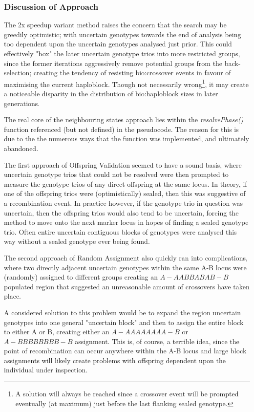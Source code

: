 \subsubsection{Discussion of Approach}

The 2x speedup variant method raises the concern that the search may be greedily optimistic; with uncertain genotypes towards the end of analysis being too dependent upon the uncertain genotypes analysed just prior. This could effectively "box" the later uncertain genotype trios into more restricted groups, since the former iterations aggressively remove potential groups from the back-selection; creating the tendency of resisting \gls{bio:crossover} events in favour of maximising the current haploblock. Though not necessarily wrong\footnote{A solution will always be reached since a crossover event will be prompted eventually (at maximum) just before the last flanking sealed genotype.}, it may create a noticeable disparity in the distribution of \gls{bio:haploblock} sizes in later generations.

The real core of the neighbouring states approach lies within the \textit{resolvePhase()} function referenced (but not defined) in the pseudocode. The reason for this is due to the the numerous ways that the function was implemented, and ultimately abandoned.

The first approach of Offspring Validation seemed to have a sound basis, where uncertain genotype trios that could not be resolved were then prompted to measure the genotype trios of any direct offspring at the same locus. In theory, if one of the offspring trios were (optimistically) sealed, then this was suggestive of a recombination event. In practice however, if the genotype trio in question was uncertain, then the offspring trios would also tend to be uncertain, forcing the method to move onto the next marker locus in hopes of finding a sealed genotype trio. Often entire uncertain contiguous blocks of genotypes were analysed this way without a sealed genotype ever being found.

The second approach of Random Assignment also quickly ran into complications, where two directly adjacent uncertain genotypes within the same A-B locus were (randomly) assigned to different groups creating an $A-AABBABAB-B$ populated region that suggested an unreasonable amount of crossovers have taken place.

A considered solution to this problem would be to expand the region uncertain genotypes into one general "uncertain block" and then to assign the entire block to either A or B, creating either an $A-AAAAAAAA-B$ or $A-BBBBBBBB-B$ assignment. This is, of course, a terrible idea, since the point of recombination can occur anywhere within the A-B locus and large block assignments will likely create problems with offspring dependent upon the individual under inspection.

